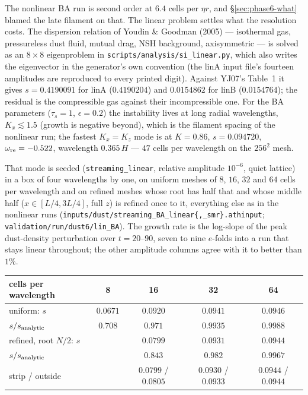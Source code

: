 \documentclass[11pt]{article}
\newcommand{\code}[1]{\texttt{#1}}
\newcommand{\file}[1]{\texttt{#1}}
\begin{document}
The nonlinear BA run is second order at $6.4$ cells per $\eta r$, and \S\ref{sec:phase6-what}
blamed the late filament on that. The linear problem settles what the resolution costs.
The dispersion relation of Youdin \& Goodman (2005) --- isothermal gas, pressureless dust
fluid, mutual drag, NSH background, axisymmetric --- is solved as an $8\times8$ eigenproblem
in \file{scripts/analysis/si\_linear.py}, which also writes the eigenvector in the
generator's own convention (the linA input file's fourteen amplitudes are reproduced to
every printed digit). Against YJ07's Table~1 it gives $s = 0.4190091$ for linA
($0.4190204$) and $0.0154862$ for linB ($0.0154764$); the residual is the compressible
gas against their incompressible one. For the BA parameters ($\tau_s = 1$,
$\epsilon = 0.2$) the instability lives at long radial wavelengths, $K_x \lesssim 1.5$
(growth is negative beyond), which is the filament spacing of the nonlinear run; the
fastest $K_x = K_z$ mode is at $K = 0.86$, $s = 0.094720$, $\omega_{\rm re} = -0.522$,
wavelength $0.365\,H$ --- $47$ cells per wavelength on the $256^2$ mesh.

That mode is seeded (\code{streaming\_linear}, relative amplitude $10^{-6}$, quiet lattice)
in a box of four wavelengths by one, on uniform meshes of $8$, $16$, $32$ and $64$ cells
per wavelength and on refined meshes whose root has half that and whose middle half
($x \in [L/4, 3L/4]$, full $z$) is refined once to it, everything else as in the
nonlinear runs (\file{inputs/dust/streaming\_BA\_linear\{,\_smr\}.athinput};
\file{validation/run/dust6/lin\_BA}). The growth rate is the log-slope of the peak
dust-density perturbation over $t = 20$--$90$, seven to nine $e$-folds into a run that
stays linear throughout; the other amplitude columns agree with it to better than $1\%$.

\begin{center}
\small
\begin{tabular}{@{}lcccc@{}}
\toprule
cells per wavelength & 8 & 16 & 32 & 64 \\
\midrule
uniform: $s$ & $0.0671$ & $0.0920$ & $0.0941$ & $0.0946$ \\
\quad $s/s_{\rm analytic}$ & $0.708$ & $0.971$ & $0.9935$ & $0.9988$ \\
refined, root $N/2$: $s$ & & $0.0799$ & $0.0931$ & $0.0944$ \\
\quad $s/s_{\rm analytic}$ & & $0.843$ & $0.982$ & $0.9967$ \\
\quad strip / outside & & $0.0799$ / $0.0805$ & $0.0930$ / $0.0933$ & $0.0944$ / $0.0944$ \\
\bottomrule
\end{tabular}
\end{center}
\end{document}
